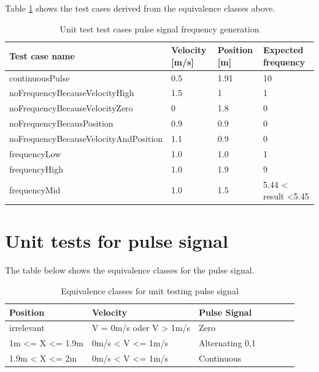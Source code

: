 Table \ref{tbl:D9_FrequencyGenerationTestCases} shows the test cases derived from the equivalence classes above.
\begin{table}[H]
\centering
\caption{Unit test test cases pulse signal frequency generation}
\begin{adjustbox}{width=1\textwidth, center=\textwidth}
\renewcommand{\arraystretch}{1}
\begin{tabular}{llll}
\textbf{Test case name}               & \textbf{Velocity {[}m/s{]}} & \textbf{Position {[}m{]}} & \textbf{Expected frequency} \\ \hline
continuousPulse                       & 0.5                         & 1.91                      & 10                                    \\
noFrequencyBecauseVelocityHigh        & 1.5                         & 1                         & 1                                     \\
noFrequencyBecauseVelocityZero        & 0                           & 1.8                       & 0                                     \\
noFrequencyBecausPosition             & 0.9                         & 0.9                       & 0                                     \\
noFrequencyBecauseVelocityAndPosition & 1.1                         & 0.9                       & 0                                     \\
frequencyLow                          & 1.0                         & 1.0                       & 1                                     \\
frequencyHigh                         & 1.0                         & 1.9                       & 9                                     \\
frequencyMid                          & 1.0                         & 1.5                       & 5.44 < result \textless 5.45 
\end{tabular}
\end{adjustbox}
\label{tbl:D9_FrequencyGenerationTestCases}
\end{table}

\section{Unit tests for pulse signal}
The table below shows the equivalence classes for the pulse signal.
\begin{table}[H]
\centering
\caption{Equivalence classes for unit testing pulse signal}
\begin{adjustbox}{width=1\textwidth, center=\textwidth}
\renewcommand{\arraystretch}{1}
\begin{tabular}{lllllll}
\textbf{Position} & \textbf{Velocity} & \textbf{Pulse Signal} \\\hline
irrelevant & V = 0m/s oder V > 1m/s & Zero\\
1m <= X <= 1.9m  & 0m/s < V <= 1m/s & Alternating 0,1\\
1.9m < X <= 2m  & 0m/s < V <= 1m/s &Continuous
\end{tabular}
\end{adjustbox}
\end{table}

